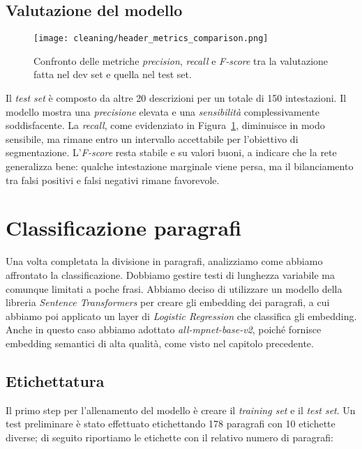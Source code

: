 \subsection{Valutazione del modello}

\begin{figure}[H]
    \centering
    \texttt{[image: cleaning/header\_metrics\_comparison.png]}
    \caption{Confronto delle metriche \textit{precision}, \textit{recall} e \textit{F-score} tra la valutazione fatta nel dev set e quella nel test set.}
    \label{fig:header-metrics}
\end{figure}

\noindent Il \textit{test set} è composto da altre 20 descrizioni per un totale di 150 intestazioni.
\noindent Il modello mostra una \textit{precisione} elevata e una \textit{sensibilità} complessivamente soddisfacente. La \textit{recall}, come evidenziato in Figura~\ref{fig:header-metrics}, diminuisce in modo sensibile, ma rimane entro un intervallo accettabile per l'obiettivo di segmentazione. L'\textit{F-score} resta stabile e su valori buoni, a indicare che la rete generalizza bene: qualche intestazione marginale viene persa, ma il bilanciamento tra falsi positivi e falsi negativi rimane favorevole.
\section{Classificazione paragrafi}

\noindent Una volta completata la divisione in paragrafi, analizziamo come abbiamo affrontato la classificazione. Dobbiamo gestire testi di lunghezza variabile ma comunque limitati a poche frasi. Abbiamo deciso di utilizzare un modello della libreria \textit{Sentence Transformers} per creare gli embedding dei paragrafi, a cui abbiamo poi applicato un layer di \textit{Logistic Regression} che classifica gli embedding. Anche in questo caso abbiamo adottato \textit{all-mpnet-base-v2}, poiché fornisce embedding semantici di alta qualità, come visto nel capitolo precedente.

\subsection{Etichettatura}

\noindent Il primo step per l'allenamento del modello è creare il \textit{training set} e il \textit{test set}. Un test preliminare è stato effettuato etichettando 178 paragrafi con 10 etichette diverse; di seguito riportiamo le etichette con il relativo numero di paragrafi:

